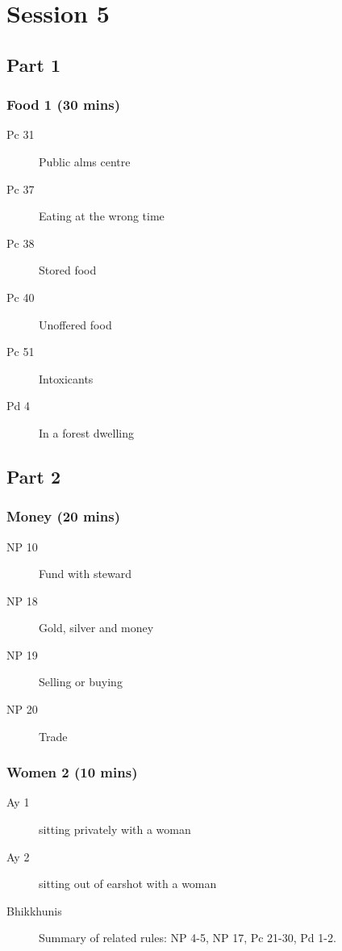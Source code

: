 \documentclass[11pt,oneside]{memoir}
\begin{document}
\chapter{Session 5}

\begin{multicols}{2}

\section{Part 1}

\subsection{Food 1 (30 mins)}

\begin{description}
\item[Pc 31] Public alms centre
\item[Pc 37] Eating at the wrong time
\item[Pc 38] Stored food
\item[Pc 40] Unoffered food
\item[Pc 51] Intoxicants
\item[Pd 4] In a forest dwelling
\end{description}

\columnbreak

\section{Part 2}

\subsection{Money (20 mins)}

\begin{description}
\item[NP 10] Fund with steward
\item[NP 18] Gold, silver and money
\item[NP 19] Selling or buying
\item[NP 20] Trade
\end{description}

\subsection{Women 2 (10 mins)}

\begin{description}
\item[Ay 1] sitting privately with a woman
\item[Ay 2] sitting out of earshot with a woman
\item[Bhikkhunis] Summary of related rules: NP 4-5, NP 17, Pc 21-30, Pd 1-2.
\end{description}

\end{multicols}
\end{document}
